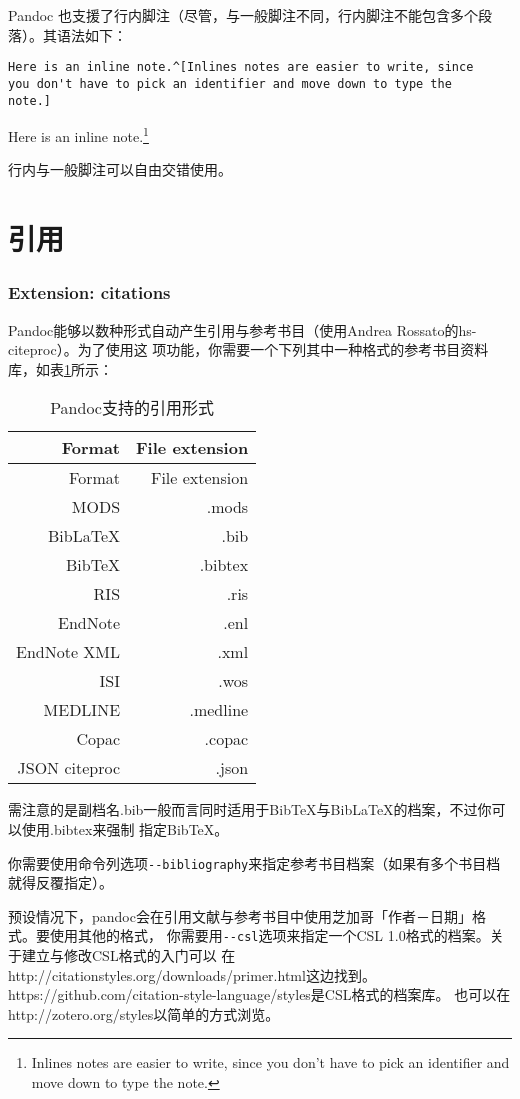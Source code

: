 \documentclass[fancyhdr,bookmark]{ctexbook}
\newcommand{\passthrough}[1]{#1}
\begin{document}
Pandoc
也支援了行内脚注（尽管，与一般脚注不同，行内脚注不能包含多个段落）。其语法如下：

\begin{lstlisting}
Here is an inline note.^[Inlines notes are easier to write, since
you don't have to pick an identifier and move down to type the
note.]
\end{lstlisting}

Here is an inline note.\footnote{Inlines notes are easier to write,
  since you don't have to pick an identifier and move down to type the
  note.}

行内与一般脚注可以自由交错使用。

\hypertarget{ux5f15ux7528-1}{%
\section{引用}\label{ux5f15ux7528-1}}

\hypertarget{extension-citations}{%
\subsubsection{Extension: citations}\label{extension-citations}}

Pandoc能够以数种形式自动产生引用与参考书目（使用Andrea
Rossato的hs-citeproc）。为了使用这
项功能，你需要一个下列其中一种格式的参考书目资料库，如表\ref{table:citations}所示：

\begin{longtable}[]{@{}rr@{}}
\caption{\label{table:citations}Pandoc支持的引用形式}\tabularnewline
\toprule
Format & File extension\tabularnewline
\midrule
\endfirsthead
\toprule
Format & File extension\tabularnewline
\midrule
\endhead
MODS & .mods\tabularnewline
BibLaTeX & .bib\tabularnewline
BibTeX & .bibtex\tabularnewline
RIS & .ris\tabularnewline
EndNote & .enl\tabularnewline
EndNote XML & .xml\tabularnewline
ISI & .wos\tabularnewline
MEDLINE & .medline\tabularnewline
Copac & .copac\tabularnewline
JSON citeproc & .json\tabularnewline
\bottomrule
\end{longtable}

需注意的是副档名.bib一般而言同时适用于BibTeX与BibLaTeX的档案，不过你可以使用.bibtex来强制
指定BibTeX。

你需要使用命令列选项\passthrough{\lstinline!--bibliography!}来指定参考书目档案（如果有多个书目档就得反覆指定）。

预设情况下，pandoc会在引用文献与参考书目中使用芝加哥「作者－日期」格式。要使用其他的格式，
你需要用\passthrough{\lstinline!--csl!}选项来指定一个CSL
1.0格式的档案。关于建立与修改CSL格式的入门可以
在http://citationstyles.org/downloads/primer.html这边找到。
https://github.com/citation-style-language/styles是CSL格式的档案库。
也可以在http://zotero.org/styles以简单的方式浏览。
\end{document}

